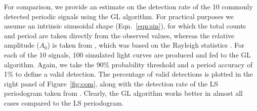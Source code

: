 \documentclass[fleqn,usenatbib]{mnras}
\begin{document}
For comparison, we provide an estimate on the detection rate of the 10 commonly detected periodic signals using the GL algorithm. For practical purposes we assume an intrinsic sinusoidal shape (Eqn.~\ref{eqn:sin}), for which the total counts and period are taken directly from the observed values, whereas the relative amplitude ($A_0$) is taken 
from \citet{2012ApJ...746..165H}, which was based on the Rayleigh statistics \citep{1983A&A...128..245B,2003ApJ...599..465M}. 
For each of the 10 signals, 100 simulated light curves are produced and fed to the GL algorithm.
Again, we take the 90\% probability threshold and a period accuracy of 1\% to define a valid detection. The percentage of valid detections 
is plotted in the right panel of Figure~\ref{fig:com}, along with the detection rate of the LS periodogram taken from \citet{2012ApJ...746..165H}.
Clearly, the GL algorithm works better in almost all cases compared to the LS periodogram. 
\end{document}
